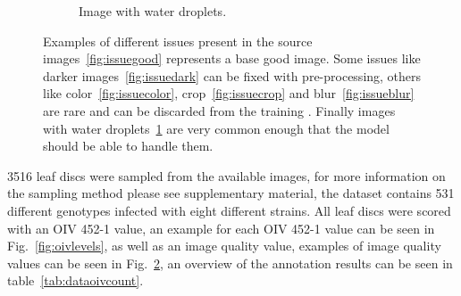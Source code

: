 \documentclass[english]{article}
\begin{document}
\begin{figure}[H]
\begin{subfigure}[b]{0.3\linewidth}
        \caption{Image with water droplets.}\label{fig:issuewater}
    \end{subfigure}
    \caption{Examples of different issues present in the source images~\ref{fig:issuegood} represents a base good image. Some issues like darker images~\ref{fig:issuedark} can be fixed with pre-processing, others like color~\ref{fig:issuecolor}, crop~\ref{fig:issuecrop} and blur~\ref{fig:issueblur} are rare and can be discarded from the training . Finally images with water droplets~\ref{fig:issuewater} are very common enough that the model should be able to handle them.}\label{fig:imagequality}
\end{figure}

3516 leaf discs were sampled from the available images, for more information on the sampling method please see supplementary material, the dataset contains 531 different genotypes infected with eight different strains. All leaf discs were scored with an OIV 452-1 value, an example for each OIV 452-1 value can be seen in Fig.~\ref{fig:oivlevels}, as well as an image quality value, examples of image quality values can be seen in Fig.~\ref{fig:imagequality}, an overview of the annotation results can be seen in table~\ref{tab:dataoivcount}.
\end{document}
